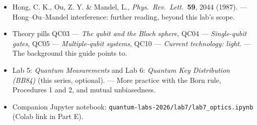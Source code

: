 \documentclass[a4paper,11pt]{article}
\begin{document}
\begin{itemize}
          LOQC/KLM context for Part A's industry anchor.
    \item Hong, C. K., Ou, Z. Y. \& Mandel, L., \textit{Phys.\ Rev.\ Lett.}\
          \textbf{59}, 2044 (1987). --- Hong--Ou--Mandel interference: further
          reading, beyond this lab's scope.
    \item Theory pills QC03 --- \textit{The qubit and the Bloch sphere}, QC04 ---
          \textit{Single-qubit gates}, QC05 --- \textit{Multiple-qubit systems}, QC10
          --- \textit{Current technology: light}. --- The background this guide points
          to.
    \item Lab 5: \textit{Quantum Measurements} and Lab 6: \textit{Quantum Key
          Distribution (BB84)} (this series, optional). --- More practice with the Born
          rule, Procedures 1 and 2, and mutual unbiasedness.
    \item Companion Jupyter notebook:
          \texttt{quantum-labs-2026/lab7/lab7\_optics.ipynb} (Colab link in
          Part E).
\end{itemize}
\end{document}
